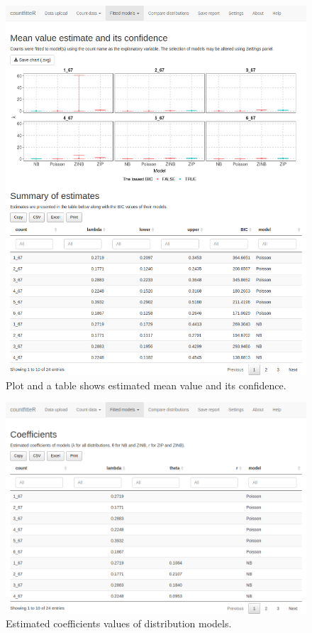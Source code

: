 \begin{figure}[htbp]
  \centering
  \includegraphics[width=0.99\columnwidth]{fig/cf_fm1.png}
  \caption{Plot and a table shows estimated mean value and its confidence.}
    \label{cf_fm1}
\end{figure}

\begin{figure}[htbp]
  \centering
  \includegraphics[width=0.99\columnwidth]{fig/cf_fm2.png}
  \caption{Estimated coefficients values of distribution models.}
    \label{cf_fm2}
\end{figure}

